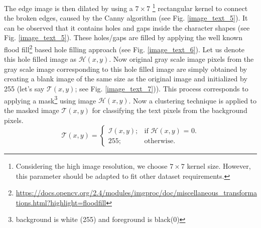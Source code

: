 \documentclass[runningheads]{llncs}
\begin{document}
The edge image is then dilated by using a $7 \times 7$ \footnote{Considering the high image resolution, we choose $7\times7$ kernel size. However, this parameter should be adapted to fit other dataset requirements.} rectangular kernel to connect the broken edges, caused by the Canny algorithm (see Fig. \ref{image_text_5}). It can be observed that it contains holes and gaps inside the character shapes (see Fig. \ref{image_text_5}). These holes/gaps are filled by applying the well known flood fill\footnote{\url{https://docs.opencv.org/2.4/modules/imgproc/doc/miscellaneous_transformations.html?highlight=floodfill}} based hole filling approach (see Fig. \ref{image_text_6}). Let us denote this hole filled image as $\mathcal{H}(x,y)$. 
Now original gray scale image pixels from the gray scale image corresponding to this hole filled image are simply obtained  by creating a blank image of the same size as the original image and initialized by 255 (let's say $\mathcal{T}(x,y)$; see Fig. \ref{image_text_7})). 
This process corresponds to applying a mask\footnote{background is white (255) and foreground is black(0)} using image $\mathcal{H}(x,y)$. Now a clustering technique is applied to the masked image $\mathcal{T}(x,y)$ for classifying the text pixels from the background pixels. 
\begin{equation}
\mathcal{T}(x,y) =
\begin{cases}
\mathcal{I}(x,y); & \text{if $\mathcal{H}(x,y)$ = 0}.\\
255; & \text{otherwise}.
\end{cases}
\end{equation}	 
\end{document}
